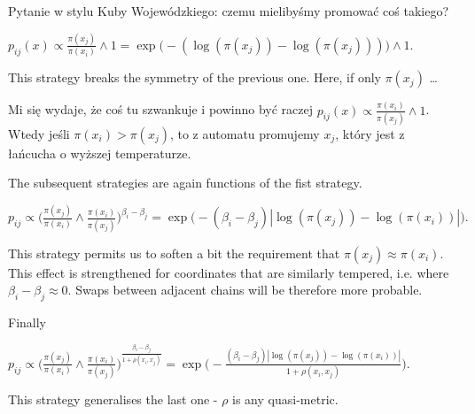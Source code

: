 \begin{questions}[resume]
	\item Pytanie w stylu Kuby Wojewódzkiego: czemu mielibyśmy promować coś takiego?
\end{questions}		
	
\begin{strategy}[resume]
	\item $p_{ij}(x) \propto \frac{\pi (x_j)}{\pi (x_i)} \wedge 1 = \exp \Big( - ( \log ( \pi(x_j) ) - \log ( \pi(x_j) ) )\Big) \wedge 1.$
\end{strategy}

	This strategy breaks the symmetry of the previous one. Here, if only $\pi(x_j)$ \dots 
	
\begin{questions}[resume]
	\item Mi się wydaje, że coś tu szwankuje i powinno być raczej $p_{ij}(x) \propto \frac{\pi (x_i)}{\pi (x_j)} \wedge 1 $. Wtedy jeśli $\pi(x_i) > \pi (x_j)$, to z automatu promujemy $x_j$, który jest z łańcucha o wyższej temperaturze. 
\end{questions}
	
	The subsequent strategies are again functions of the fist strategy.
	
\begin{strategy}[resume]
	\item $p_{ij} \propto \Big( \frac{\pi (x_j)}{\pi( x_i )} \wedge \frac{\pi (x_i)}{\pi( x_j )} \Big)^{\beta_i - \beta_j} = \exp \Big( - (\beta_i - \beta_j)| \log ( \pi(x_j) ) - \log ( \pi(x_i) ) | \Big).$ 
\end{strategy}
	
	This strategy permits us to soften a bit the requirement that $\pi(x_j) \approx \pi (x_i)$. This effect is strengthened for coordinates that are similarly tempered, i.e. where $\beta_i - \beta_j \approx 0$. Swaps between adjacent chains will be therefore more probable. 
	
	Finally
	
\begin{strategy}[resume]
	\item $p_{ij} \propto \Big( \frac{\pi (x_j)}{\pi( x_i )} \wedge \frac{\pi (x_i)}{\pi( x_j )} \Big)^\frac{\beta_i - \beta_j}{1 + \rho(x_i, x_j)} = \exp \Big( - \frac{(\beta_i - \beta_j)| \log ( \pi(x_j) ) - \log ( \pi(x_i) ) |}{{1 + \rho(x_i, x_j)}} \Big).$
\end{strategy} 

	This strategy generalises the last one - $\rho$ is any quasi-metric. 